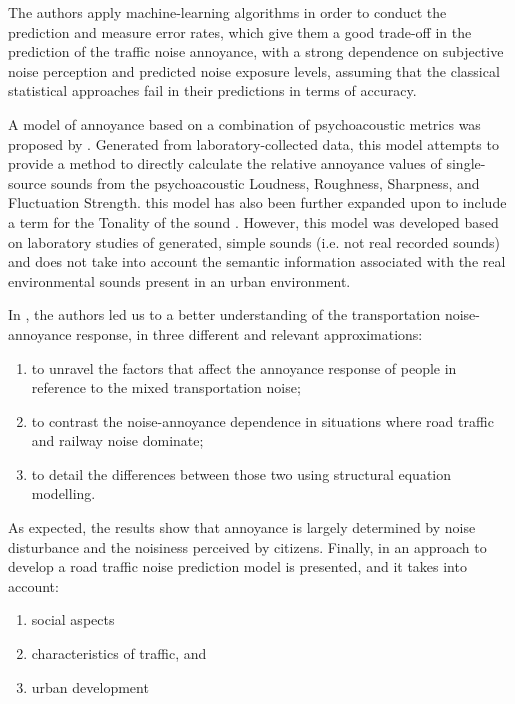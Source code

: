    The authors apply machine-learning algorithms in order to conduct the prediction and measure error rates, which give them a good trade-off in the prediction of the traffic noise annoyance, with a strong dependence on subjective noise perception and predicted noise exposure levels, assuming that the classical statistical approaches fail in their predictions in terms of accuracy. %

   A model of annoyance based on a combination of psychoacoustic metrics was proposed by \citet{PsychoacousticsfactsmodelsZwicker}. Generated from laboratory-collected data, this model attempts to provide a method to directly calculate the relative annoyance values of single-source sounds from the psychoacoustic Loudness, Roughness, Sharpness, and Fluctuation Strength. this model has also been further expanded upon to include a term for the Tonality of the sound . However, this model was developed based on laboratory studies of generated, simple sounds (i.e. not real recorded sounds) and does not take into account the semantic information associated with the real environmental sounds present in an urban environment.

   In , the authors led us to a better understanding of the transportation noise-annoyance response, in three different and relevant approximations:

   \begin{enumerate}
     \item to unravel the factors that affect the annoyance response of people in reference to the mixed transportation noise;
     \item to contrast the noise-annoyance dependence in situations where road traffic and railway noise dominate;
     \item to detail the differences between those two using structural equation modelling.
   \end{enumerate}

   As expected, the results show that annoyance is largely determined by noise disturbance and the noisiness perceived by citizens. Finally, in  an approach to develop a road traffic noise prediction model is presented, and it takes into account:

   \begin{enumerate}
     \item social aspects
     \item characteristics of traffic, and
     \item urban development
   \end{enumerate}

